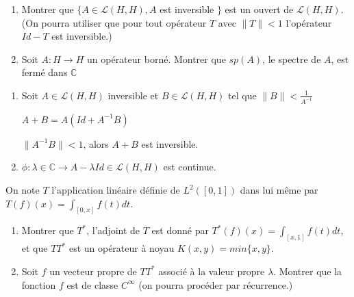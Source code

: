 \documentclass[10pt,a4paper,oneside]{article}
\newenvironment{exercice}[1][Exercice]{\begin{trivlist}
\item[\hskip \labelsep {\bfseries #1}]}{\end{trivlist}}
\newenvironment{solution}[1][Solution]{\begin{trivlist}
\item[\hskip \labelsep {\bfseries #1}]}{\end{trivlist}}
\begin{document}

\begin{exercice}

\begin{enumerate}

\item
Montrer que $\{ A \in \mathcal{L}(H,H), A$ est inversible $\}$ est un ouvert de $\mathcal{L}(H,H)$. (On pourra utiliser que pour tout opérateur $T$ avec $\| T \| < 1$ l'opérateur $Id-T$ est inversible.)

\item
Soit $A:H \rightarrow H$ un opérateur borné. Montrer que $sp(A)$, le spectre de $A$, est fermé dans $\mathbb{C}$

\end{enumerate}

\end{exercice}


\begin{solution}

\begin{enumerate}

\item
Soit $A \in \mathcal{L}(H,H)$ inversible et $B \in \mathcal{L}(H,H)$ tel que $\| B \| < \frac{1}{A^{-1}}$

$A + B = A(Id + A^{-1}B)$

$\| A^{-1}B \| < 1$, alors $A+B$ est inversible.

\item
$\phi: \lambda \in \mathbb{C} \rightarrow A-\lambda Id \in \mathcal{L}(H,H)$ est continue.


\end{enumerate}

\end{solution}


\begin{exercice}
On note $T$ l'application linéaire définie de $L^2([0,1])$ dans lui même par $T(f)(x) = \int_{[0,x]}f(t)dt$.

\begin{enumerate}
\item
Montrer que $T^*$, l'adjoint de $T$ est donné par $T^*(f)(x) = \int_{[x,1]}f(t)dt$, et que $TT^*$ est un opérateur à noyau $K(x,y) = min\{x,y\}$.

\item
Soit $f$ un vecteur propre de $TT^{*}$ associé à la valeur propre $\lambda$. Montrer que la fonction $f$ est de classe $C^{\infty}$ (on pourra procéder par récurrence.)

\end{enumerate}

\end{exercice}
\end{document}
